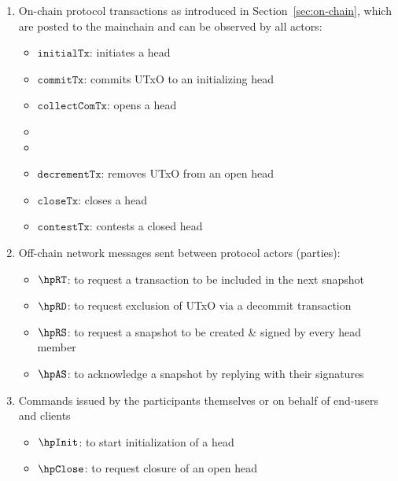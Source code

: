 \begin{enumerate}
  \item On-chain protocol transactions as introduced in
  Section~\ref{sec:on-chain}, which are posted to the mainchain and can be
  observed by all actors:
  \begin{itemize}
    \item $\mathtt{initialTx}$: initiates a head
    \item $\mathtt{commitTx}$: commits UTxO to an initializing head
    \item $\mathtt{collectComTx}$: opens a head
    \item {}
    \item {}
    \item $\mathtt{decrementTx}$: removes UTxO from an open head
    \item $\mathtt{closeTx}$: closes a head
    \item $\mathtt{contestTx}$: contests a closed head
  \end{itemize}
  \item Off-chain network messages sent between protocol actors (parties):
  \begin{itemize}
    \item $\hpRT$: to request a transaction to be included in the next snapshot
    \item $\hpRD$: to request exclusion of UTxO via a decommit transaction
    \item $\hpRS$: to request a snapshot to be created \& signed by every head member
    \item $\hpAS$: to acknowledge a snapshot by replying with their signatures
  \end{itemize}
  \item Commands issued by the participants themselves or on behalf of end-users and clients
  \begin{itemize}
    \item $\hpInit$: to start initialization of a head
    \item $\hpClose$: to request closure of an open head
  \end{itemize}
\end{enumerate}



